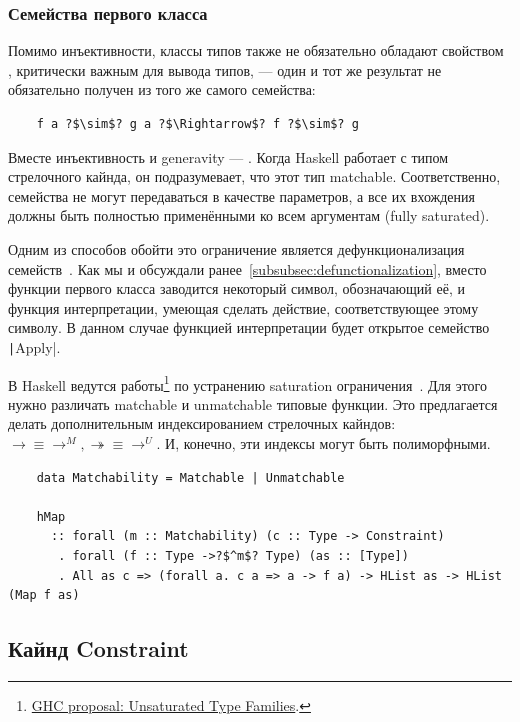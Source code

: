 \subsubsection{Семейства первого класса}

Помимо инъективности, классы типов также не обязательно обладают свойством , критически важным для вывода типов, --- один и тот же результат не обязательно получен из того же самого семейства:
\begin{verbatim}
    f a ?$\sim$? g a ?$\Rightarrow$? f ?$\sim$? g
\end{verbatim}

Вместе инъективность и generavity --- .
Когда Haskell работает с типом стрелочного кайнда, он подразумевает, что этот тип matchable.
Соответственно, семейства не могут передаваться в качестве параметров, а все их вхождения должны быть полностью применёнными ко всем аргументам (fully saturated).

Одним из способов обойти это ограничение является дефункционализация семейств~\cite{defunctionalization-slides, eisenberg2014promoting}.
Как мы и обсуждали ранее~\ref{subsubsec:defunctionalization}, вместо функции первого класса заводится некоторый символ, обозначающий её, и функция интерпретации, умеющая сделать действие, соответствующее этому символу.
В данном случае функцией интерпретации будет открытое семейство \texttt|Apply|.

В Haskell ведутся работы\footnote{\href{https://ghc-proposals.readthedocs.io/en/latest/proposals/0242-unsaturated-type-families.html}{GHC proposal: Unsaturated Type Families}.} по устранению saturation ограничения~\cite{kiss2019higher}.
Для этого нужно различать matchable и unmatchable типовые функции.
Это предлагается делать дополнительным индексированием стрелочных кайндов: $\to \equiv
\to^M, \twoheadrightarrow \equiv \to^U$.
И, конечно, эти индексы могут быть полиморфными.

\begin{verbatim}
    data Matchability = Matchable | Unmatchable

    hMap
      :: forall (m :: Matchability) (c :: Type -> Constraint)
       . forall (f :: Type ->?$^m$? Type) (as :: [Type])
       . All as c => (forall a. c a => a -> f a) -> HList as -> HList (Map f as)
\end{verbatim}

\subsection{Кайнд Constraint}

